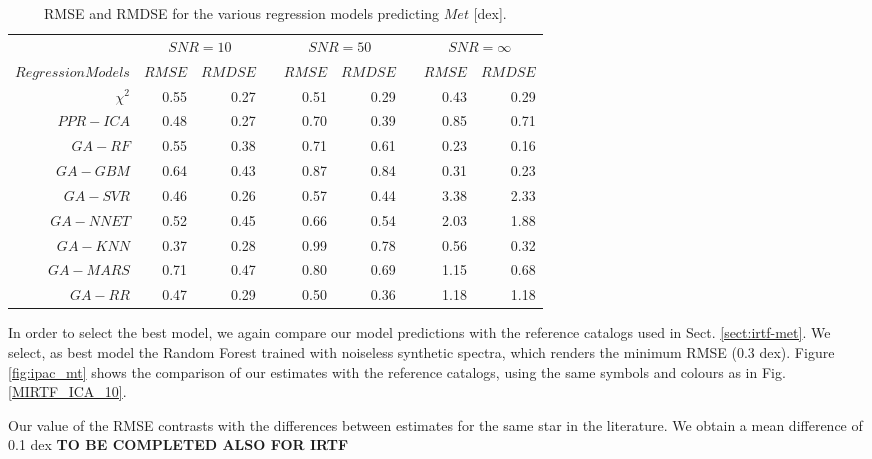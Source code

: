 %
%
\begin{table}\centering
\begin{tabular}{@{}rrrcrrcrr@{}}\toprule
& \multicolumn{2}{c}{$SNR = 10$} & \phantom{ab}& \multicolumn{2}{c}{$SNR = 50$} &
\phantom{ab} & \multicolumn{2}{c}{$SNR = \infty$}\\
\cmidrule{2-3} \cmidrule{5-6} \cmidrule{8-9}
$Regression Models$ & $RMSE$ & $RMDSE$ && $RMSE$ & $RMDSE$     && $RMSE$       & $RMDSE$ \\ \midrule
$\chi^2$    & 0.55 & 0.27 && 0.51 & 0.29 && 0.43  & 0.29 \\
$PPR-ICA$   & 0.48 & 0.27 && 0.70 & 0.39 && 0.85  & 0.71 \\
$GA-RF$     & 0.55 & 0.38 && 0.71 & 0.61 && 0.23  & 0.16 \\
$GA-GBM$    & 0.64 & 0.43 && 0.87 & 0.84 && 0.31  & 0.23 \\
$GA-SVR$    & 0.46 & 0.26 && 0.57 & 0.44 && 3.38  & 2.33 \\
$GA-NNET$   & 0.52 & 0.45 && 0.66 & 0.54 && 2.03  & 1.88 \\
$GA-KNN$    & 0.37 & 0.28 && 0.99 & 0.78 && 0.56  & 0.32 \\ 
$GA-MARS$   & 0.71 & 0.47 && 0.80 & 0.69 && 1.15  & 0.68 \\
$GA-RR$     & 0.47 & 0.29 && 0.50 & 0.36 && 1.18  & 1.18 \\

\bottomrule
\end{tabular}
\caption {RMSE and RMDSE for the various regression models predicting $Met$ [dex].} 
\label{tab:models_M_rmse} 
\end{table}

In order to select the best model, we again compare our model predictions with the 
reference catalogs used in Sect. \ref{sect:irtf-met}. We select, as best model the 
Random Forest trained with noiseless synthetic spectra, which renders the minimum 
RMSE (0.3 dex). Figure \ref{fig:ipac_mt} shows the comparison of our 
estimates with the reference catalogs, using the same symbols and colours as in 
Fig. \ref{MIRTF_ICA_10}.  

Our value of the RMSE contrasts with the differences between estimates for the 
same star in the literature. We obtain a mean difference of 0.1 dex {\bf TO BE COMPLETED ALSO FOR IRTF}


